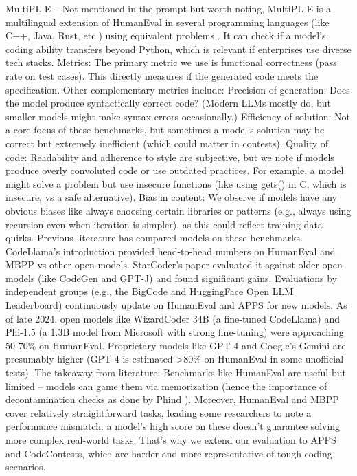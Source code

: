 MultiPL-E \autocite{Xu2022} – Not mentioned in the prompt but worth noting, MultiPL-E is a multilingual extension of HumanEval in several programming languages (like C++, Java, Rust, etc.) using equivalent problems \autocite{Xu2022}. It can check if a model’s coding ability transfers beyond Python, which is relevant if enterprises use diverse tech stacks.
Metrics: The primary metric we use is functional correctness (pass rate on test cases). This directly measures if the generated code meets the specification. Other complementary metrics include:
Precision of generation: Does the model produce syntactically correct code? (Modern LLMs mostly do, but smaller models might make syntax errors occasionally.)
Efficiency of solution: Not a core focus of these benchmarks, but sometimes a model’s solution may be correct but extremely inefficient (which could matter in contests).
Quality of code: Readability and adherence to style are subjective, but we note if models produce overly convoluted code or use outdated practices. For example, a model might solve a problem but use insecure functions (like using gets() in C, which is insecure, vs a safe alternative).
Bias in content: We observe if models have any obvious biases like always choosing certain libraries or patterns (e.g., always using recursion even when iteration is simpler), as this could reflect training data quirks.
Previous literature has compared models on these benchmarks. CodeLlama’s introduction provided head-to-head numbers on HumanEval and MBPP vs other open models​. StarCoder’s paper evaluated it against older open models (like CodeGen and GPT-J) and found significant gains​. Evaluations by independent groups (e.g., the BigCode and HuggingFace Open LLM Leaderboard) continuously update on HumanEval and APPS for new models. As of late 2024, open models like WizardCoder 34B (a fine-tuned CodeLlama) and Phi-1.5 (a 1.3B model from Microsoft with strong fine-tuning) were approaching 50-70\% on HumanEval. Proprietary models like GPT-4 and Google’s Gemini are presumably higher (GPT-4 is estimated >80\% on HumanEval in some unofficial tests).
The takeaway from literature: Benchmarks like HumanEval are useful but limited – models can game them via memorization (hence the importance of decontamination checks as done by Phind \autocite{Phind2023}). Moreover, HumanEval and MBPP cover relatively straightforward tasks, leading some researchers to note a performance mismatch: a model’s high score on these doesn’t guarantee solving more complex real-world tasks​. That’s why we extend our evaluation to APPS and CodeContests, which are harder and more representative of tough coding scenarios.
